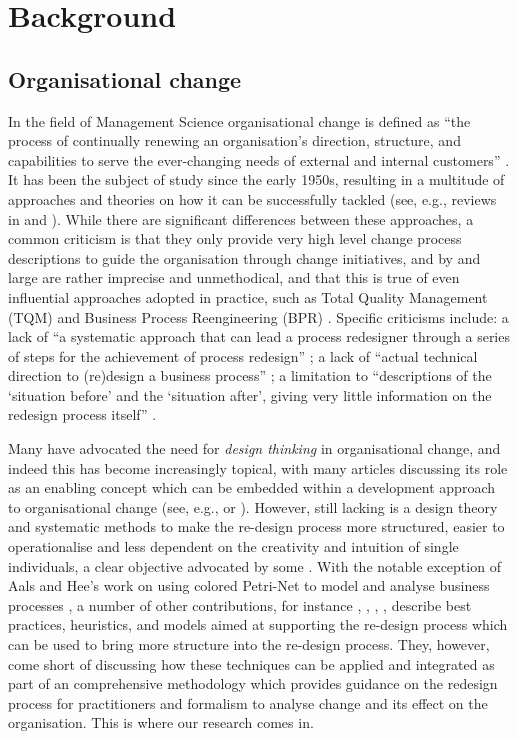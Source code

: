 \documentclass[runningheads,a4paper]{llncs}
\begin{document}
\section{Background} \label{sect:Background}

\subsection{Organisational change}
In the field of Management Science organisational change is defined as ``the process of continually renewing an organisation's direction, structure, and capabilities to serve the ever-changing needs of external and internal customers'' \cite{Moran:2000ex}. It has been the subject of study since the early 1950s, resulting in a multitude of approaches and theories on how it can be successfully tackled (see, e.g., reviews in \cite{vandeVen:1995uw} and \cite{pettigrew2001studying}). While there are significant differences between these approaches, a common criticism is that they only provide very high level change process descriptions to guide the organisation through change initiatives, and by and large are rather imprecise and unmethodical, and that this is true of even influential approaches adopted in practice, such as Total Quality Management (TQM) and Business Process Reengineering (BPR) \cite{Cao:2004dh}. Specific criticisms include: a lack of ``a systematic approach that can lead a process redesigner through a series of steps for the achievement of process redesign'' \cite{doi:10.1108/14637159910249117}; a lack of ``actual technical direction to (re)design a business process'' \cite{Reijers2005283}; a limitation to ``descriptions of the `situation before' and the `situation after', giving very little information on the redesign process itself'' \cite{Gerrits:1994:BMB:646303.686971}.

Many have advocated the need for {\it design thinking} \cite{rowe1991design} in organisational change, and indeed this has become increasingly topical, with many articles discussing its role as an enabling concept which can be embedded within a development approach to organisational change (see, e.g., \cite{3460223} or \cite{deserti2014design}). However, still lacking is a design theory and systematic methods to make the re-design process more structured, easier to operationalise and less dependent on the creativity and intuition of single individuals, a clear objective advocated by some \cite{verkerk2004trust,Kleiner:2000vm}. With the notable exception of Aals and Hee's work on using colored Petri-Net to model and analyse business processes \cite{van1996business}, a number of other contributions, for instance \cite{grover1993information}, \cite{limam2007best}, \cite{reijers2005best}, \cite{berio2001enterprise}, describe best practices, heuristics, and models aimed at supporting the re-design process which can be used to bring more structure into the re-design process. They, however, come short of discussing how these techniques can be applied and integrated as part of an comprehensive methodology which provides guidance on the redesign process for practitioners and formalism to analyse change and its effect on the organisation. This is where our research comes in.
\end{document}

